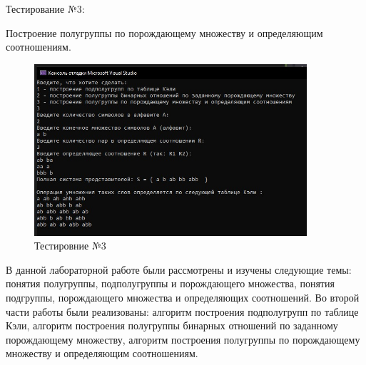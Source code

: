 \documentclass[bachelor, och, labwork]{shiza}
\begin{document}
	Тестирование №3:

Построение полугруппы по порождающему множеству и определяющим соотношениям.

	
	\begin{figure}[H]
		\centering
		\includegraphics[width=0.9\textwidth]{test_3}
		\caption{Тестировние №3}
		\label{fig:test_3}
	\end{figure}
	
	\newpage
	\conclusion %
	
	В данной лабораторной работе были рассмотрены и изучены следующие темы: понятия полугруппы, подполугруппы и порождающего множества, понятия подгруппы, порождающего множества и определяющих соотношений. Во второй части работы были реализованы: алгоритм построения подполугрупп по таблице Кэли, алгоритм построения полугруппы бинарных отношений по заданному порождающему множеству, алгоритм построения полугруппы по порождающему множеству и определяющим соотношениям.  
	  
	
	
	
\end{document}
